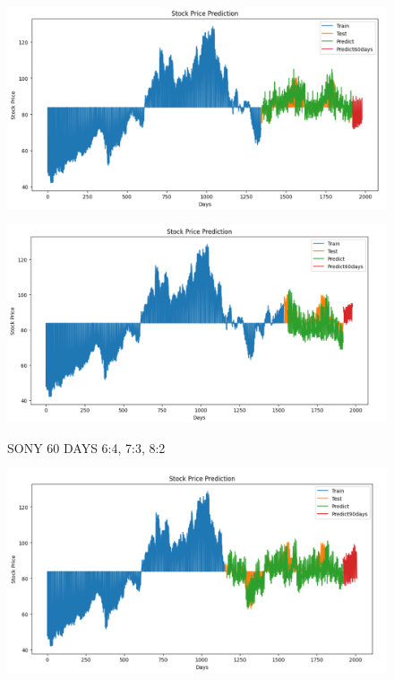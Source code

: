 \documentclass{article}
\begin{document}
\begin{multicols}{2}
\begin{figure}[H]
\begin{minipage}{0.15\textwidth}
    \label{fig:1}
    \end{minipage}%
    \begin{minipage}{0.15\textwidth}
    \centering
    \includegraphics[width=1\textwidth]{Image/N_Beat/N_BEAT_7_3_SONY_60DAYS.png}
  
    \label{fig:2}
    \end{minipage}%
    \begin{minipage}{0.15\textwidth}
    \centering
    \includegraphics[width=1\textwidth]{Image/N_Beat/N_BEAT_8_2_SONY_60DAYS.png}

    \label{fig:3}
    \end{minipage}
    \caption{SONY 60 DAYS  6:4, 7:3, 8:2 }
\end{figure}

\begin{figure}[H]
    \centering
    \begin{minipage}{0.15\textwidth}
    \centering
    \includegraphics[width=1\textwidth]{Image/N_Beat/N_BEAT_6_4_SONY_90DAYS.png}
   

\end{minipage}
\end{figure}
\end{multicols}
\end{document}
